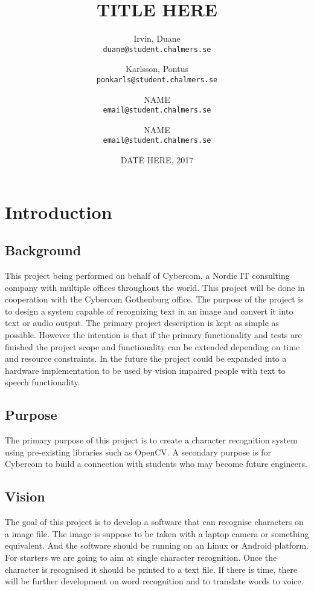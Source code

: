 \documentclass[a4paper, english]{scrartcl}
\title{TITLE HERE}
\author{Irvin, Duane \\ \texttt{duane@student.chalmers.se}
  \and Karlsson, Pontus \\ \texttt{ponkarls@student.chalmers.se}
  \and NAME \\ \texttt{email@student.chalmers.se}
  \and NAME \\ \texttt{email@student.chalmers.se}
}
\date{DATE HERE, 2017}
\begin{document}
\clearpage\maketitle
\thispagestyle{empty}

\pagebreak

\setcounter{page}{1}
\hypersetup{linkcolor=black}
\tableofcontents

\pagebreak

\section{Introduction}
\subsection{Background}
This project being performed on behalf of Cybercom,
a Nordic IT consulting company with multiple offices throughout the world.
This project will be done in cooperation with the Cybercom Gothenburg office.
The purpose of the project is to design a system capable of recognizing text 
in an image and convert it into text or audio output. 
The primary project description is kept as simple as possible. 
However the intention is that if the primary functionality and tests are 
finished the project scope and functionality can be extended depending on 
time and resource constraints. 
In the future the project could be expanded into a hardware implementation 
to be used by vision impaired people with text to speech functionality.
\subsection{Purpose}
The primary purpose of this project is to create a character recognition
system using pre-existing libraries such as OpenCV. 
A secondary purpose is for Cybercom to build a connection with students 
who may become future engineers. 
\subsection{Vision}
The goal of this project is to develop a software that can recognise 
characters on a image file. 
The image is suppose to be taken with a laptop camera or something equivalent.
And the software should be running on an Linux or Android platform. 
For starters we are going to aim at single character recognition.
Once the character is recognised it should be printed to a text file.
If there is time, there will be further development on word recognition and
to translate words to voice.
\end{document}

